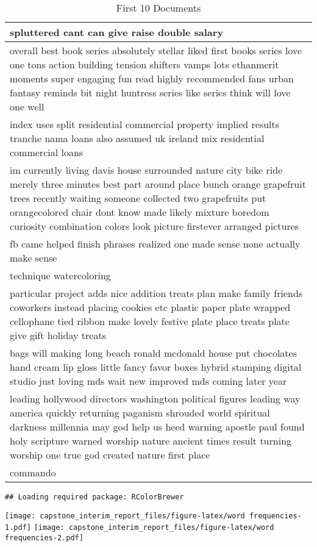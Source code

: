 \documentclass[
]{article}
\begin{document}
\begin{table}

\caption{\label{tab:build corpus}First 10 Documents}
\begin{tabular}[t]{l}
\hline
spluttered cant can give raise double salary\\
\hline
overall best book series absolutely stellar liked first books series love one tons action building tension shifters vamps lots ethanmerit moments super engaging fun read highly recommended fans urban fantasy reminds bit night huntress series like series think will love one well\\
\hline
index uses split residential commercial property implied results tranche nama loans also assumed uk ireland mix residential commercial loans\\
\hline
im currently living davis house surrounded nature city bike ride merely three minutes best part around place bunch orange grapefruit trees recently waiting someone collected two grapefruits put orangecolored chair dont know made likely mixture boredom curiosity combination colors look picture firstever arranged pictures\\
\hline
fb came helped finish phrases realized one made sense none actually make sense\\
\hline
technique watercoloring\\
\hline
particular project adds nice addition treats plan make family friends coworkers instead placing cookies etc plastic paper plate wrapped cellophane tied ribbon make lovely festive plate place treats plate give gift holiday treats\\
\hline
bags will making long beach ronald mcdonald house put chocolates hand cream lip gloss little fancy favor boxes hybrid stamping digital studio just loving mds wait new improved mds coming later year\\
\hline
leading hollywood directors washington political figures leading way america quickly returning paganism shrouded world spiritual darkness millennia may god help us heed warning apostle paul found holy scripture warned worship nature ancient times result turning worship one true god created nature first place\\
\hline
commando\\
\hline
\end{tabular}
\end{table}

\begin{verbatim}
## Loading required package: RColorBrewer
\end{verbatim}

\texttt{[image: capstone\_interim\_report\_files/figure-latex/word frequencies-1.pdf]}
\texttt{[image: capstone\_interim\_report\_files/figure-latex/word frequencies-2.pdf]}
\end{document}
